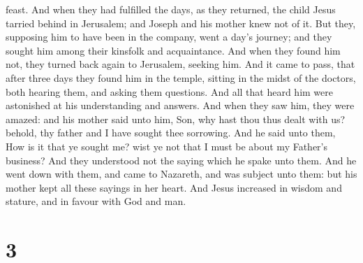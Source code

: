feast.  And when they had fulfilled the days, as they
returned, the child Jesus tarried behind in Jerusalem; and Joseph and
his mother knew not of it.  But they, supposing him to
have been in the company, went a day's journey; and they sought him
among their kinsfolk and acquaintance.  And when they
found him not, they turned back again to Jerusalem, seeking him.
 And it came to pass, that after three days they found
him in the temple, sitting in the midst of the doctors, both hearing
them, and asking them questions.  And all that heard him
were astonished at his understanding and answers.  And
when they saw him, they were amazed: and his mother said unto him, Son,
why hast thou thus dealt with us? behold, thy father and I have sought
thee sorrowing.  And he said unto them, How is it that ye
sought me? wist ye not that I must be about my Father's business?
 And they understood not the saying which he spake unto
them.  And he went down with them, and came to Nazareth,
and was subject unto them: but his mother kept all these sayings in her
heart.  And Jesus increased in wisdom and stature, and in
favour with God and man.

\hypertarget{section-2}{%
\section{3}\label{section-2}}

